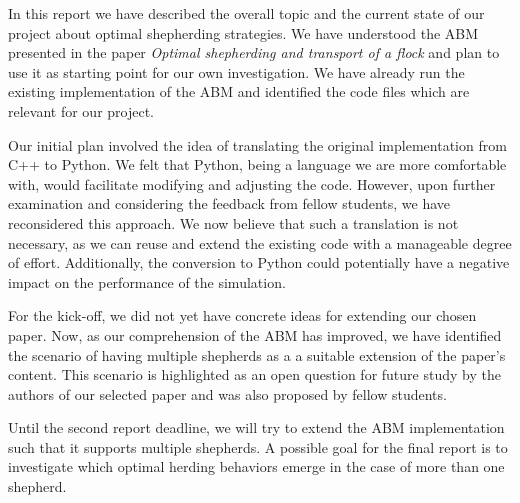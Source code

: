 In this report we have described the overall topic and the current state of our project about optimal shepherding strategies. We have understood the ABM presented in the paper \textit{Optimal shepherding and transport of a flock} and plan to use it as starting point for our own investigation. We have already run the existing implementation of the ABM and identified the code files which are relevant for our project.

Our initial plan involved the idea of translating the original implementation from C++ to Python. We felt that Python, being a language we are more comfortable with, would facilitate modifying and adjusting the code. However, upon further examination and considering the feedback from fellow students, we have reconsidered this approach. We now believe that such a translation is not necessary, as we can reuse and extend the existing code with a manageable degree of effort. Additionally, the conversion to Python could potentially have a negative impact on the performance of the simulation.

For the kick-off, we did not yet have concrete ideas for extending our chosen paper. Now, as our comprehension of the ABM has improved, we have identified the scenario of having multiple shepherds as a a suitable extension of the paper's content. This scenario is highlighted as an open question for future study by the authors of our selected paper and was also proposed by fellow students.

Until the second report deadline, we will try to extend the ABM implementation such that it supports multiple shepherds. A possible goal for the final report is to investigate which optimal herding behaviors emerge in the case of more than one shepherd.
